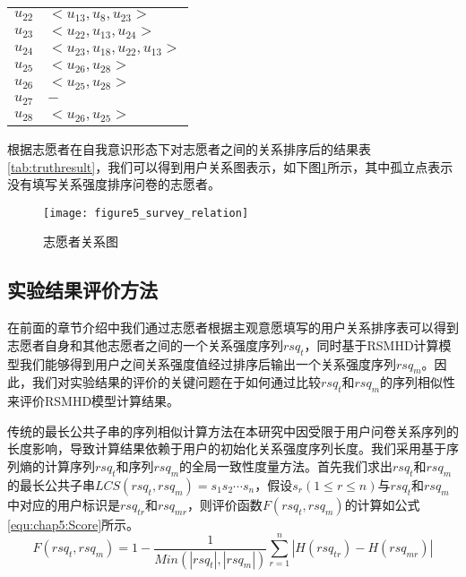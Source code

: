 \begin{table}[htb]
\begin{minipage}[t]{0.8\linewidth}
\begin{tabular*}{\linewidth}{cp{10cm}}
      \mbox{$u_{22} $}& \mbox{$ <u_{13},u_{8},u_{23}>$}\\
      \mbox{$u_{23}$} & \mbox{$ <u_{22},u_{13},u_{24}>$}\\
      \mbox{$u_{24}$} &\mbox{$ <u_{23},u_{18},u_{22},u_{13}>$}\\
      \mbox{$u_{25} $}&\mbox{$ <u_{26},u_{28}>$}\\
      \mbox{$u_{26} $}&\mbox{$ <u_{25},u_{28}>$}\\
      \mbox{$u_{27} $}&\mbox{$ -$}\\
      \mbox{$u_{28}$} &\mbox{$ <u_{26},u_{25}>$}\\
      \bottomrule[1.5pt]
    \end{tabular*}
  \end{minipage}
\end{table}
\par 根据志愿者在自我意识形态下对志愿者之间的关系排序后的结果表\ref{tab:truthresult}，我们可以得到用户关系图表示，如下图\ref{fig:survey_relation}所示，其中孤立点表示没有填写关系强度排序问卷的志愿者。
\begin{figure}[htb]
\centering
\texttt{[image: figure5\_survey\_relation]}
\caption{志愿者关系图}
\label{fig:survey_relation}
\end{figure}
\subsection{实验结果评价方法}
在前面的章节介绍中我们通过志愿者根据主观意愿填写的用户关系排序表可以得到志愿者自身和其他志愿者之间的一个关系强度序列$rsq_{t}$，同时基于RSMHD计算模型我们能够得到用户之间关系强度值经过排序后输出一个关系强度序列$rsq_{m}$。因此，我们对实验结果的评价的关键问题在于如何通过比较$rsq_{t}$和$rsq_{m}$的序列相似性来评价RSMHD模型计算结果。
\par 传统的最长公共子串的序列相似计算方法在本研究中因受限于用户问卷关系序列的长度影响，导致计算结果依赖于用户的初始化关系强度序列长度。我们采用基于序列熵的计算序列$rsq_{t}$和序列$rsq_{m}$的全局一致性度量方法。首先我们求出$rsq_{t}$和$rsq_{m}$的最长公共子串$LCS(rsq_{t},rsq_{m})=s_{1}s_{2}\cdots s_{n}$，假设$s_{r}(1\leqslant r \leqslant n)$与$rsq_{t}$和$rsq_{m}$中对应的用户标识是$rsq_{tr}$和$rsq_{mr}$，则评价函数$F(rsq_{t},rsq_{m})$的计算如公式\ref{equ:chap5:Score}所示。
\begin{equation}
\label{equ:chap5:Score}
F(rsq_{t},rsq_{m})=1-\frac{1}{Min(  \left |rsq_{t}  \right |, \left |rsq_{m}  \right | ) }\sum_{r=1}^{n}\left | H(rsq_{tr})-H(rsq_{mr}) \right |
\end{equation}

